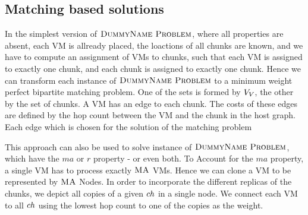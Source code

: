 \subsection{Matching based solutions} 

In the simplest version of $\textsc{DummyName Problem}$, where all properties are absent, each VM 
is allready placed, the loactions of all chunks are known, and we have to 
compute an assignment of VMs to chunks, such that each VM is assigned to 
exactly one chunk, and each chunk is assigned to exactly one chunk. Hence we 
can transform each instance of $\textsc{DummyName Problem}$ to a minimum weight perfect bipartite 
matching problem. One of the sets is formed by $V_V$, the other by the 
set of chunks. A VM has an edge to each chunk. The costs of these edges are 
defined by the hop count between the VM and the chunk in the host graph. Each 
edge which is chosen for the solution of the matching problem


This approach can also be used to solve instance of $\textsc{DummyName Problem}$, which have the 
$ma$ or $r$ property - or even both. 
To Account for the $ma$ property, a single VM has to process exactly 
$\textsc{MA}$ VMs. Hence we can clone a VM to be represented by $\textsc{MA}$ Nodes.
In order to incorporate the different 
replicas of the chunks, we depict all copies of a given $ch$ in a 
single %
node. We connect each VM to all $ch$ using the 
lowest hop count to one of the copies as the weight.